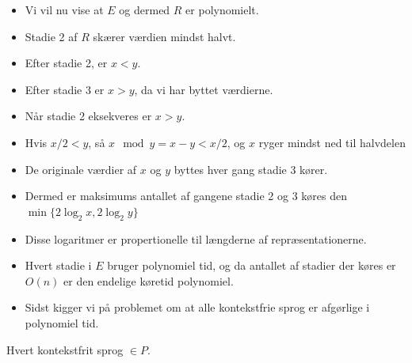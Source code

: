 \begin{frame}[allowframebreaks]
\begin{itemize}
		\item Vi vil nu vise at $E$ og dermed $R$ er polynomielt.
		\item Stadie 2 af $R$ skærer værdien mindst halvt.
		\item Efter stadie 2, er $x < y$.
		\item Efter stadie 3 er $x > y$, da vi har byttet værdierne.
		\item Når stadie 2 eksekveres er $x > y$.
		\item Hvis $x/2 < y$, så $x \mod y = x - y < x / 2$, og $x$ ryger mindst ned til halvdelen
		\item De originale værdier af $x$ og $y$ byttes hver gang stadie 3 kører.
		\item Dermed er maksimums antallet af gangene stadie 2 og 3 køres den $\min\{ 2 \log_{2} x, 2 \log_{2} y\}$
		\item Disse logaritmer er propertionelle til længderne af repræsentationerne.
		\item Hvert stadie i $E$ bruger polynomiel tid, og da antallet af stadier der køres er $O(n)$ er den endelige køretid polynomiel.
		\item Sidst kigger vi på problemet om at alle kontekstfrie sprog er afgørlige i polynomiel tid.
	\end{itemize}

  \begin{theorem}
Hvert kontekstfrit sprog $\in P$.
  \end{theorem}


\end{frame}
